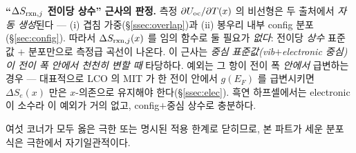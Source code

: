 \begin{keybox}
\textbf{``$\Delta S_{\mathrm{rxn},j}$ 전이당 상수'' 근사의 판정.} 측정 $\partial U_{\mathrm{oc}}/\partial T(x)$ 의 비선형은 두
출처에서 \emph{자동 생성}된다 --- (i) 겹침 가중(\S\ref{ssec:overlap})과 (ii) 봉우리 내부 config 분포
(\S\ref{sec:config}). 따라서 $\Delta S_{\mathrm{rxn},j}(x)$ 를 임의 함수로 둘 필요가 \emph{없다}: 전이당 \emph{상수}
표준값 $+$ 분포만으로 측정급 곡선이 나온다. 이 근사는 \emph{중심 표준값(vib$+$electronic 중심)이 전이 폭 안에서
천천히 변할 때} 타당하다. 예외는 그 항이 전이 폭 \emph{안에서} 급변하는 경우 --- 대표적으로 LCO 의 MIT 가 한
전이 안에서 $g(E_F)$ 를 급변시키면 $\Delta S_e(x)$ 만은 $x$-의존으로 유지해야 한다(\S\ref{ssec:elec}). 흑연
하프셀에서는 electronic 이 소수라 이 예외가 거의 없고, config$+$중심 상수로 충분하다.
\end{keybox}

여섯 코너가 모두 옳은 극한 또는 명시된 적용 한계로 닫히므로, 본 파트가 세운 분포 식은 극한에서 자기일관적이다.

